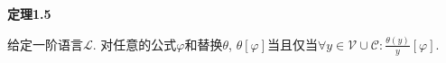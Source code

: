 \documentclass[UTF8]{ctexart}
\begin{document}





\newpage




\hypertarget{sec:定理1.5}{}
\noindent\textbf{定理1.5}

给定一阶语言$\mathcal{L}$. 对任意的公式$\varphi$和替换$\theta$,
$\theta[\varphi]$当且仅当$\displaystyle\forall y\in\mathcal{V}\cup\mathcal{C}:
\frac{\theta(y)}{y}[\varphi]$.


\end{document}
